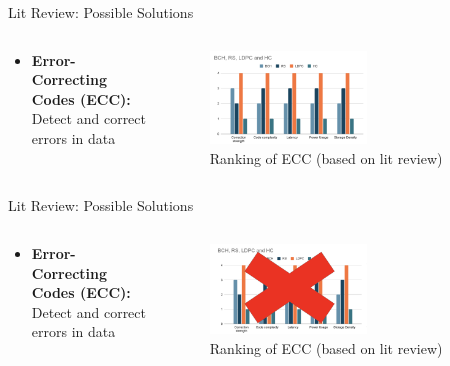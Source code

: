 \begin{frame}{Lit Review: Possible Solutions}
    \begin{columns}
        \begin{column}{0.5\textwidth}
            \begin{itemize}
                \item \textbf{Error-Correcting Codes (ECC):} Detect and correct errors in data
            \end{itemize}
        \end{column}
        \begin{column}{0.5\textwidth}
            \begin{figure}
                \centering
                \includegraphics[height=0.5\textheight,width=0.6\textwidth,keepaspectratio]{images/ecc.png}
                \caption{Ranking of ECC (based on lit review)}
            \end{figure}
        \end{column}
    \end{columns}  
\end{frame}

\begin{frame}{Lit Review: Possible Solutions}
    \begin{columns}
        \begin{column}{0.5\textwidth}
            \begin{itemize}
                \item \textbf{Error-Correcting Codes (ECC):} Detect and correct errors in data
            \end{itemize}
        \end{column}
        \begin{column}{0.5\textwidth}
            \begin{figure}
                \centering
                \includegraphics[height=0.5\textheight,width=0.6\textwidth,keepaspectratio]{images/ecc_x.png}
                \caption{Ranking of ECC (based on lit review)}
            \end{figure}
        \end{column}
    \end{columns}  
\end{frame}

